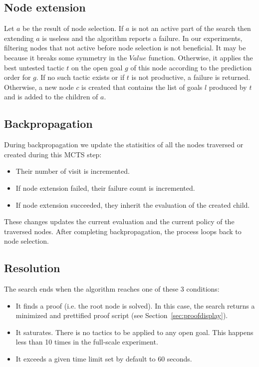 \documentclass[runningheads,a4paper,draft]{svjour3}
\begin{document}
\subsection{Node extension}
Let $a$ be the result of node selection.
If $a$ is not an active part of the search then extending $a$ is useless and
the algorithm reports a failure. In our experiments, filtering nodes that not
active before node selection is
not beneficial. It may be because it breaks some symmetry in the
$\mathit{Value}$ function.
Otherwise, it applies the best untested tactic $t$ on the open goal $g$ of this
node according to the prediction order for $g$. If no such tactic exists or if
$t$ is not productive, a failure is returned.
Otherwise, a new node $c$ is created that contains the list of goals $l$
produced by $t$ and is added to the children of $a$.


\subsection{Backpropagation}
During backpropagation we update the statisitics of all the nodes traversed or
created during this MCTS step:
\begin{itemize}
\item Their number of visit is incremented.
\item If node extension failed, their failure count is incremented.
\item If node extension succeeded, they inherit the evaluation of the created
child.
\end{itemize}

These changes updates the current evaluation and the current policy of the
traversed nodes.
After completing backpropagation, the process loops back to node
selection.

\subsection{Resolution}
The search ends when the algorithm reaches one of these 3 conditions:
\begin{itemize}
\item It finds a proof (i.e. the root node is solved). In this case,
the search returns a minimized and
prettified proof script (see Section~\ref{sec:proofdisplay}).
\item It saturates. There is no tactics to be applied to any open goal.
This happens less than 10 times in the full-scale experiment.
\item It exceeds a given time limit set by default to 60 seconds.
\end{itemize}
\end{document}
